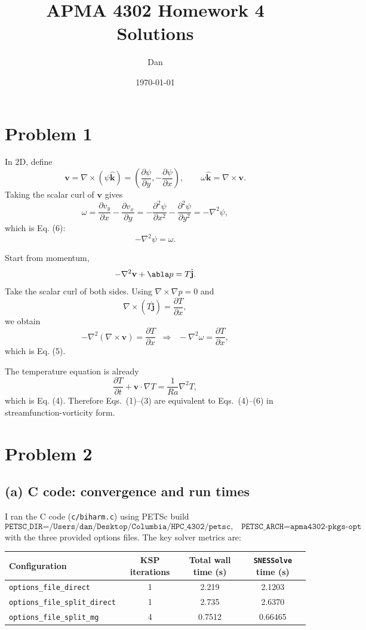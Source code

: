 \documentclass[11pt]{article}
\title{APMA 4302 Homework 4 \\ Solutions}
\author{Dan}
\date{\today}
\begin{document}
\maketitle

\section*{Problem 1}
In 2D, define
\[
\mathbf{v} = \nabla \times (\psi \hat{\mathbf{k}})
= \left(\frac{\partial \psi}{\partial y}, -\frac{\partial \psi}{\partial x}\right),
\qquad
\omega \hat{\mathbf{k}} = \nabla \times \mathbf{v}.
\]
Taking the scalar curl of $\mathbf{v}$ gives
\[
\omega = \frac{\partial v_y}{\partial x} - \frac{\partial v_x}{\partial y}
= -\frac{\partial^2 \psi}{\partial x^2} - \frac{\partial^2 \psi}{\partial y^2}
= -\nabla^2 \psi,
\]
which is Eq. (6):
\[
-\nabla^2 \psi = \omega.
\]

Start from momentum,
\[
-\nabla^2 \mathbf{v} + \abla p = T \hat{\mathbf{j}}.
\]
Take the scalar curl of both sides. Using $\nabla \times \nabla p = 0$ and
\[
\nabla \times (T\hat{\mathbf{j}}) = \frac{\partial T}{\partial x},
\]
we obtain
\[
-\nabla^2 (\nabla \times \mathbf{v}) = \frac{\partial T}{\partial x}
\;\;\Longrightarrow\;\;
-\nabla^2 \omega = \frac{\partial T}{\partial x},
\]
which is Eq. (5).

The temperature equation is already
\[
\frac{\partial T}{\partial t} + \mathbf{v}\cdot \nabla T
= \frac{1}{Ra}\nabla^2 T,
\]
which is Eq. (4). Therefore Eqs.~(1)--(3) are equivalent to Eqs.~(4)--(6) in streamfunction-vorticity form.

\section*{Problem 2}
\subsection*{(a) C code: convergence and run times}
I ran the C code (\texttt{c/biharm.c}) using PETSc build
\[
\texttt{PETSC\_DIR=/Users/dan/Desktop/Columbia/HPC\_4302/petsc},\quad
\texttt{PETSC\_ARCH=apma4302-pkgs-opt}
\]
with the three provided options files. The key solver metrics are:

\begin{center}
\begin{tabular}{lccc}
\hline
Configuration & KSP iterations & Total wall time (s) & \texttt{SNESSolve} time (s) \\
\hline
\texttt{options\_file\_direct} & 1 & 2.219 & 2.1203 \\
\texttt{options\_file\_split\_direct} & 1 & 2.735 & 2.6370 \\
\texttt{options\_file\_split\_mg} & 4 & 0.7512 & 0.66465 \\
\hline
\end{tabular}
\end{center}
\end{document}
